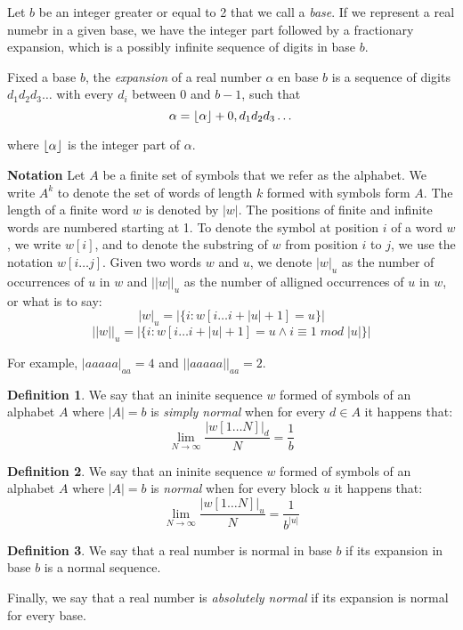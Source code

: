 \documentclass[11pt,a4paper]{tesis}
\theoremstyle{definition}
\newtheorem{definition}{Definition}[section]
\DeclarePairedDelimiter{\floor}{\lfloor}{\rfloor}
\begin{document}
Let $b$ be an integer greater or equal to 2 that we call a \textit{base}. If we represent a real numebr in a given base, we have the integer part followed by a fractionary expansion, which is a possibly infinite sequence of digits in base $b$.

Fixed a base $b$, the \textit{expansion} of a real number $\alpha$ en base $b$ is a sequence of digits $d_1d_2d_3\dots$ with every $d_i$ between 0 and $b-1$, such that
$$\alpha = \floor{\alpha} + 0,d_1d_2d_3\dots$$

where $\floor{\alpha}$ is the integer part of $\alpha$.

\textbf{Notation}
Let $A$ be a finite set of symbols that we refer as the alphabet. We write $A^k$ to denote the set of words of length $k$ formed with symbols form $A$. The length of a finite word $w$ is denoted by $|w|$.
The positions of finite and infinite words are numbered starting at 1. To denote the symbol at position $i$ of a word $w$, we write $w[i]$, and to denote the substring of $w$ from position $i$ to $j$, we use the notation $w[i \dots j]$.  
Given two words $w$ and $u$, we denote $|w|_u$ as the number of occurrences of $u$ in $w$ and $||w||_u$ as the number of alligned occurrences of $u$ in $w$, or what is to say:
    $$|w|_u = |\{i: w[i \dots i + |u| + 1] = u\}|$$
    $$||w||_u = |\{i: w[i \dots i + |u| + 1] = u \wedge i \equiv 1 \; mod \; |u| \}|$$

For example, $|aaaaa|_{aa} = 4$ and $||aaaaa||_{aa} = 2$.
\\

\begin{definition}
    We say that an ininite sequence $w$ formed of symbols of an alphabet $A$ where $|A| = b$ is \textit{simply normal} when for every $d \in A$ it happens that:
    $$\lim_{N\to\infty} \frac{|w[1 \dots N]|_d}{N} = \frac{1}{b}$$
\end{definition}

\begin{definition}
    We say that an ininite sequence $w$ formed of symbols of an alphabet $A$ where $|A| = b$ is \textit{normal} when for every block $u$ it happens that:
    $$\lim_{N\to\infty} \frac{|w[1 \dots N]|_u}{N} = \frac{1}{b^{|u|}}$$
\end{definition}

\begin{definition}
    We say that a real number is normal in base $b$ if its expansion in base $b$ is a normal sequence. 
    
    Finally, we say that a real number is \textit{absolutely normal} if its expansion is normal for every base.
\end{definition}
\end{document}
